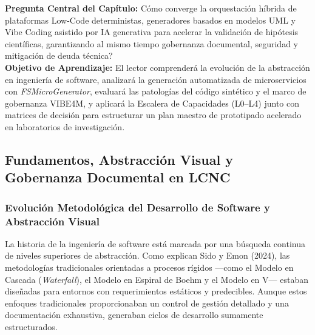 \begin{cajabeige}
\textbf{Pregunta Central del Capítulo:} \textquestiondown Cómo converge la orquestación híbrida de plataformas Low-Code deterministas, generadores basados en modelos UML y Vibe Coding asistido por IA generativa para acelerar la validación de hipótesis científicas, garantizando al mismo tiempo gobernanza documental, seguridad y mitigación de deuda técnica?\\[0.3cm]
\textbf{Objetivo de Aprendizaje:} El lector comprenderá la evolución de la abstracción en ingeniería de software, analizará la generación automatizada de microservicios con \textit{FSMicroGenerator}, evaluará las patologías del código sintético y el marco de gobernanza VIBE4M, y aplicará la Escalera de Capacidades (L0--L4) junto con matrices de decisión para estructurar un plan maestro de prototipado acelerado en laboratorios de investigación.
\end{cajabeige}


\vspace{0.4cm}

\subsection{Fundamentos, Abstracción Visual y Gobernanza Documental en LCNC}

\subsubsection{Evolución Metodológica del Desarrollo de Software y Abstracción Visual}

La historia de la ingeniería de software está marcada por una búsqueda continua de niveles superiores de abstracción. Como explican Sido y Emon (2024), las metodologías tradicionales orientadas a procesos rígidos ---como el Modelo en Cascada (\textit{Waterfall}), el Modelo en Espiral de Boehm y el Modelo en V--- estaban diseñadas para entornos con requerimientos estáticos y predecibles. Aunque estos enfoques tradicionales proporcionaban un control de gestión detallado y una documentación exhaustiva, generaban ciclos de desarrollo sumamente estructurados.

